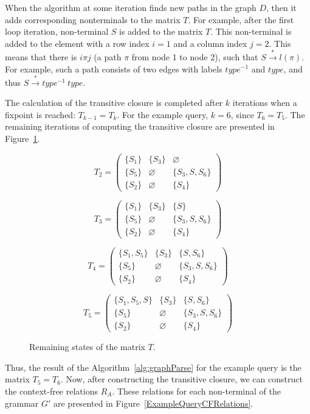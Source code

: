 When the algorithm at some iteration finds new paths in the graph $D$, then it adds corresponding nonterminals to the matrix $T$. For example, after the first loop iteration, non-terminal $S$ is added to the matrix $T$. This non-terminal is added to the element with a row index $i = 1$ and a column index $j = 2$. This means that there is $i\pi j$ (a path $\pi$ from node 1 to node 2), such that $S \xrightarrow{*} l(\pi)$. For example, such a path consists of two edges with labels $type^{-1}$ and $type$, and thus $S \xrightarrow{*} type^{-1} \ type$.

The calculation of the transitive closure is completed after $k$ iterations when a fixpoint is reached: $T_{k-1} = T_k$. For the example query, $k = 6$, since $T_6 = T_5$. The remaining iterations of computing the transitive closure are presented in Figure~\ref{ExampleQueryFinalIterations}.

\begin{figure}[h]
\[
T_2 = \begin{pmatrix}
    \{S_1\} & \{S_3\} & \varnothing \\ \{S_5\} & \varnothing & \{S_3, S, S_6\} \\ \{S_2\} & \varnothing & \{S_4\}
\end{pmatrix}
\]

\[
T_3 = \begin{pmatrix}
    \{S_1\} & \{S_3\} & \{S\} \\ \{S_5\} & \varnothing & \{S_3, S, S_6\} \\ \{S_2\} & \varnothing & \{S_4\}
\end{pmatrix}
\]

\[
T_4 = \begin{pmatrix}
    \{S_1, S_5\} & \{S_3\} & \{S, S_6\} \\ \{S_5\} & \varnothing & \{S_3, S, S_6\} \\ \{S_2\} & \varnothing & \{S_4\}
\end{pmatrix}
\]

\[
T_5 = \begin{pmatrix}
    \{S_1, S_5, S\} & \{S_3\} & \{S, S_6\} \\ \{S_5\} & \varnothing & \{S_3, S, S_6\} \\ \{S_2\} & \varnothing & \{S_4\}
\end{pmatrix}
\]
\caption{Remaining states of the matrix $T$.}
\label{ExampleQueryFinalIterations}
\end{figure}

Thus, the result of the Algorithm~\ref{alg:graphParse} for the example query is the matrix $T_5 = T_6$. Now, after constructing the transitive closure, we can construct the context-free relations $R_A$. These relations for each non-terminal of the grammar $G'$ are presented in Figure~\ref{ExampleQueryCFRelations}.

